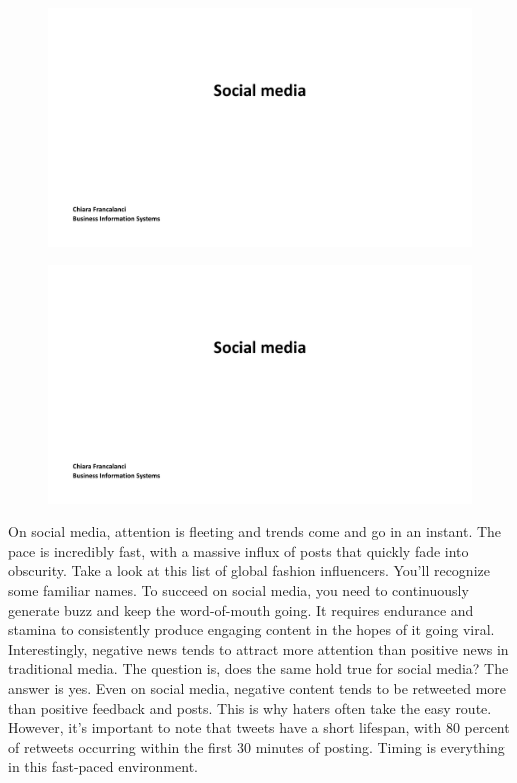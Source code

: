 \begin{figure}[!h]
  \centering
  \includegraphics[page=21, trim = 2cm 8cm 3cm 4cm, clip, width=\imagewidth]{images/04 - Social_Media.pdf}
\end{figure}

\begin{figure}[!h]
  \centering
  \includegraphics[page=22, trim = 2cm 5cm 3cm 3.5cm, clip, width=\imagewidth]{images/04 - Social_Media.pdf}
\end{figure}

On social media, attention is fleeting and trends come and go in an
instant. The pace is incredibly fast, with a massive influx of posts
that quickly fade into obscurity. Take a look at this list of global
fashion influencers. You'll recognize some familiar names. To succeed on
social media, you need to continuously generate buzz and keep the
word-of-mouth going. It requires endurance and stamina to consistently
produce engaging content in the hopes of it going viral. Interestingly,
negative news tends to attract more attention than positive news in
traditional media. The question is, does the same hold true for social
media? The answer is yes. Even on social media, negative content tends
to be retweeted more than positive feedback and posts. This is why
haters often take the easy route. However, it's important to note that
tweets have a short lifespan, with 80 percent of retweets occurring
within the first 30 minutes of posting. Timing is everything in this
fast-paced environment.

